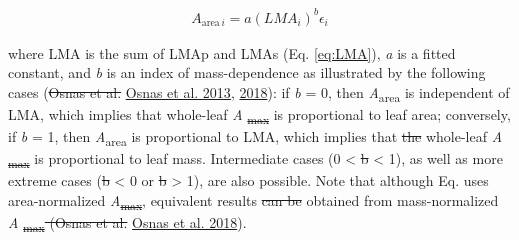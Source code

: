 \documentclass[
  12pt,
]{article}
\providecommand{\DIFaddtex}[1]{{\protect\color{blue}\uwave{#1}}} %
\providecommand{\DIFdeltex}[1]{{\protect\color{red}\sout{#1}}}                      %
\providecommand{\DIFaddbegin}{} %
\providecommand{\DIFaddend}{} %
\providecommand{\DIFdelbegin}{} %
\providecommand{\DIFdelend}{} %
\providecommand{\DIFadd}[1]{\texorpdfstring{\DIFaddtex{#1}}{#1}} %
\providecommand{\DIFdel}[1]{\texorpdfstring{\DIFdeltex{#1}}{}} %
\newcommand{\DIFscaledelfig}{0.5}
\newlength{\DIFdelgraphicswidth} %
\newlength{\DIFdelgraphicsheight} %
\newcommand{\DIFaddincludegraphics}[2][]{{\color{blue}\fbox{\DIFOincludegraphics[#1]{#2}}}} %
\newcommand{\DIFdelincludegraphics}[2][]{%
\sbox{\DIFdelgraphicsbox}{\DIFOincludegraphics[#1]{#2}}%
\settoboxwidth{\DIFdelgraphicswidth}{\DIFdelgraphicsbox} %
\settoboxtotalheight{\DIFdelgraphicsheight}{\DIFdelgraphicsbox} %
\scalebox{\DIFscaledelfig}{%
\parbox[b]{\DIFdelgraphicswidth}{\usebox{\DIFdelgraphicsbox}\\[-\baselineskip] \rule{\DIFdelgraphicswidth}{0em}}\llap{\resizebox{\DIFdelgraphicswidth}{\DIFdelgraphicsheight}{%
\setlength{\unitlength}{\DIFdelgraphicswidth}%
\begin{picture}(1,1)%
\thicklines\linethickness{2pt} %
{\color[rgb]{1,0,0}\put(0,0){\framebox(1,1){}}}%
{\color[rgb]{1,0,0}\put(0,0){\line( 1,1){1}}}%
{\color[rgb]{1,0,0}\put(0,1){\line(1,-1){1}}}%
\end{picture}%
}\hspace*{3pt}}} %
} %
\DeclareRobustCommand{\DIFaddbegin}{\DIFOaddbegin \let\includegraphics\DIFaddincludegraphics} %
\DeclareRobustCommand{\DIFaddend}{\DIFOaddend \let\includegraphics\DIFOincludegraphics} %
\DeclareRobustCommand{\DIFdelbegin}{\DIFOdelbegin \let\includegraphics\DIFdelincludegraphics} %
\DeclareRobustCommand{\DIFdelend}{\DIFOaddend \let\includegraphics\DIFOincludegraphics} %
\begin{document}
\begin{align}
A_{\mathrm{area} \, i} = a (LMA_i)^{b}\epsilon_i \DIFdelbegin %
\DIFdelend \DIFaddbegin \tag{8}
\DIFaddend \end{align}

where LMA is the sum of LMAp and LMAs (Eq. \eqref{eq:LMA}), \emph{a} is a fitted constant, and \emph{b} is an index of mass-dependence as illustrated by the following cases (\DIFdelbegin \DIFdel{Osnas et al. }\DIFdelend \protect\DIFdelbegin %
\DIFdelend \DIFaddbegin \hyperlink{ref-Osnas2013}{Osnas et al. 2013}\DIFaddend , \protect\hyperlink{ref-Osnas2018}{2018}): if \emph{b} = 0, then \emph{A}\textsubscript{area} is independent of LMA, which implies that whole-leaf \emph{A} \DIFdelbegin \DIFdel{\textsubscript{max} }\DIFdelend is proportional to leaf area; conversely, if \emph{b} = 1, then \emph{A}\textsubscript{area} is proportional to LMA, which implies that \DIFdelbegin \DIFdel{the }\DIFdelend whole-leaf \emph{A} \DIFdelbegin \DIFdel{\textsubscript{max} }\DIFdelend is proportional to leaf mass.
Intermediate cases (0 \textless{} \DIFdelbegin \DIFdel{b }\DIFdelend \DIFaddbegin \emph{\DIFadd{b}} \DIFaddend \textless{} 1), as well as more extreme cases (\DIFdelbegin \DIFdel{b }\DIFdelend \DIFaddbegin \emph{\DIFadd{b}} \DIFaddend \textless{} 0 or \DIFdelbegin \DIFdel{b }\DIFdelend \DIFaddbegin \emph{\DIFadd{b}} \DIFaddend \textgreater{} 1), are also possible.
Note that although Eq. \DIFdelbegin %
\DIFdelend \DIFaddbegin \DIFadd{8 }\DIFaddend uses area-normalized \emph{A}\DIFdelbegin \DIFdel{\textsubscript{max}}\DIFdelend , equivalent results \DIFdelbegin \DIFdel{can be }\DIFdelend \DIFaddbegin \DIFadd{are }\DIFaddend obtained from mass-normalized \emph{A} \DIFdelbegin \DIFdel{\textsubscript{max} (Osnas et al. }\DIFdelend \DIFaddbegin \DIFadd{(}\DIFaddend \protect\DIFdelbegin %
\DIFdelend \DIFaddbegin \hyperlink{ref-Osnas2018}{Osnas et al. 2018}\DIFaddend ).
\end{document}
